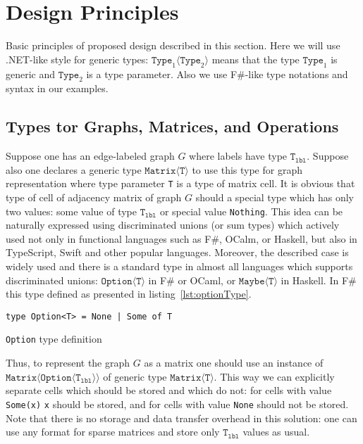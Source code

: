 \section{Design Principles}

Basic principles of proposed design described in this section.
Here we will use .NET-like style for generic types: $\texttt{Type}_1\langle\texttt{Type}_2\rangle$ means that the type $\texttt{Type}_1$ is generic and $\texttt{Type}_2$ is a type parameter.
Also we use F\#-like type notations and syntax in our examples.

\subsection{Types tor Graphs, Matrices, and Operations}

Suppose one has an edge-labeled graph $G$ where labels have type $\texttt{T}_{\texttt{lbl}}$.
Suppose also one declares a generic type $\texttt{Matrix} \langle \texttt{T} \rangle$ to use this type for graph representation where type parameter \texttt{T} is a type of matrix cell.
It is obvious that type of cell of adjacency matrix of graph $G$ should a special type which has only two values: some value of type $\texttt{T}_{\texttt{lbl}}$ or special value \texttt{Nothing}.
This idea can be naturally expressed using discriminated unions (or sum types) which actively used not only in functional languages such as F\#, OCalm, or Haskell, but also in TypeScript, Swift and other popular languages.
Moreover, the described case is widely used and there is a standard type in almost all languages which supports discriminated unions: $\texttt{Option} \langle \texttt{T} \rangle$ in F\# or OCaml, or $\texttt{Maybe} \langle \texttt{T} \rangle$ in Haskell.
In F\# this type defined as presented in listing~\ref{lst:optionType}.

\begin{listing}[h]
\begin{verbatim}
type Option<T> = None | Some of T
\end{verbatim}
\caption{\texttt{Option} type definition}
\label{lst:optionType}
\end{listing}


Thus, to represent the graph $G$ as a matrix one should use an instance of $\texttt{Matrix} \langle \texttt{Option}\langle \texttt{T}_{\texttt{lbl}} \rangle \rangle $  of generic type $\texttt{Matrix}\langle \texttt{T} \rangle$.
This way we can explicitly separate cells which should be stored and which do not: for cells with value \texttt{Some(x)} \texttt{x} should be stored, and for cells with value \texttt{None} should not be stored. Note that there is no storage and data transfer overhead in this solution: one can use any format for sparse matrices and store only $\texttt{T}_{\texttt{lbl}}$ values as usual.


